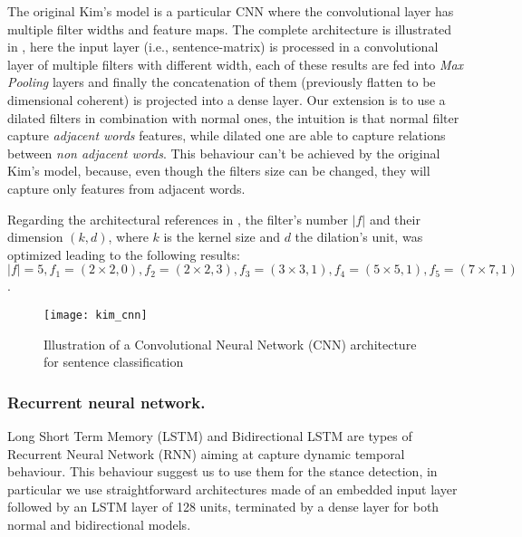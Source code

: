 The original Kim's model is a particular CNN where the convolutional layer has multiple filter widths and feature maps.
The complete architecture is illustrated in , here the input layer (i.e., sentence-matrix) is processed in a convolutional layer of multiple filters with different width, each of these results are fed into \emph{Max Pooling} layers and finally the concatenation of them (previously flatten to be dimensional coherent) is projected into a dense layer.
Our extension is to use a dilated filters in combination with normal ones, the intuition is that normal filter capture \emph{adjacent words} features, while dilated one are able to capture relations between \emph{non adjacent words}.
This behaviour can't be achieved by the original Kim's model, because, even though the filters size can be changed, they will capture only features from adjacent words.

Regarding the architectural references in \cite{kim2014convolutional}, the filter's number $|f|$ and their dimension $(k,d)$, where $k$ is the kernel size and $d$ the dilation's unit, was optimized leading to the following results: $|f| = 5, f_1 = (2\times2,0), f_2 = (2\times2,3), f_3 = (3\times3,1), f_4 = (5\times5,1), f_5 = (7\times7,1)$.

\begin{figure}[h]
\footnotesize
\centering
\texttt{[image: kim\_cnn]}
\caption{\cite{zhang2015sensitivity} Illustration of a Convolutional Neural Network (CNN) architecture for sentence classification}
\label{fig:kim}
\end{figure}

\subsubsection{Recurrent neural network.}
Long Short Term Memory (LSTM) and Bidirectional LSTM are types of Recurrent Neural Network (RNN) aiming at capture dynamic temporal behaviour.
This behaviour suggest us to use them for the stance detection, in particular we use straightforward architectures made of an embedded input layer followed by an LSTM layer of 128 units, terminated by a dense layer for both normal and bidirectional models.